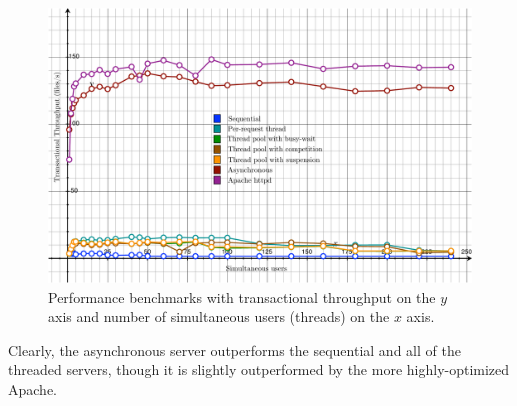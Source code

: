 \documentclass[letterpaper,12pt]{article}
\begin{document}
\begin{figure}[t]
	\centering
	\includegraphics[width=1.0\textwidth]{doc/benchmarks_fig.pdf}
	\caption{Performance benchmarks with transactional throughput on the $y$ axis and number of simultaneous users (threads) on the $x$ axis.}
\end{figure}

Clearly, the asynchronous server outperforms the sequential and all of the threaded servers, though it is slightly outperformed by the more highly-optimized Apache.
\end{document}
